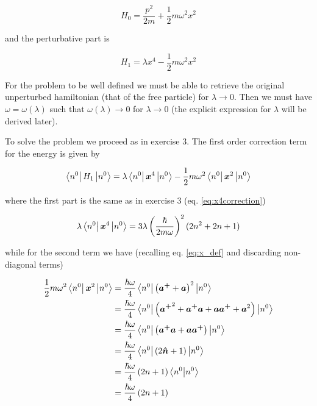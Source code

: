 \documentclass{article}
\begin{document}
\begin{equation}
H_0 = \frac{p^2}{2m} + \frac{1}{2}m\omega^2x^2
\end{equation}

and the perturbative part is

\begin{equation}
H_1 = \lambda x^4 - \frac{1}{2}m\omega^2 x^2
\end{equation}

For the problem to be well defined we must be able to retrieve the original unperturbed hamiltonian (that of the free particle) for \( \lambda \rightarrow 0 \). Then we must have \( \omega = \omega(\lambda) \) such that \( \omega(\lambda) \rightarrow 0 \) for \( \lambda \rightarrow 0 \) (the explicit expression for \( \lambda \) will be derived later).

To solve the problem we proceed as in exercise 3. The first order correction term for the energy is given by

\begin{equation}
\bra{n^0} H_1 \ket{n^0} = \lambda \bra{n^0}\bm{x}^4 \ket{n^0} - \frac{1}{2}m\omega^2 \bra{n^0}\bm{x}^2\ket{n^0}
\end{equation}

where the first part is the same as in exercise 3 (eq. \eqref{eq:x4correction})

\begin{equation}
\lambda \bra{n^0}\bm{x}^4 \ket{n^0} = 3 \lambda \left( \frac{\hbar}{2m \omega} \right)^2 (2n^2 + 2n +1)
\end{equation}

while for the second term we have (recalling eq. \eqref{eq:x_def} and discarding non-diagonal terms)

\begin{align}
\frac{1}{2} m \omega^2 \bra{n^0} \bm{x}^2 \ket{n^0} & = \frac{\hbar\omega}{4} \bra{n^0} \left( \bm{a^+} + \bm{a} \right)^2 \ket{n^0} \nonumber \\
& = \frac{\hbar\omega}{4} \bra{n^0} \left( {\bm{a^+}}^2 + \bm{a^+}\bm{a} + \bm{a}\bm{{a}^+} + \bm{a}^2 \right) \ket{n^0} \nonumber \\
& = \frac{\hbar\omega}{4} \bra{n^0} \left(\bm{a^+}\bm{a} + \bm{a}\bm{{a}^+}\right) \ket{n^0} \nonumber \\
& = \frac{\hbar\omega}{4} \bra{n^0} \left(2\bm{\hat{n}} + 1\right) \ket{n^0} \nonumber \\
& = \frac{\hbar\omega}{4} \left(2n + 1\right) \braket{n^0}{n^0} \nonumber \\
& = \frac{\hbar\omega}{4} \left(2n + 1\right)
\end{align}
\end{document}
